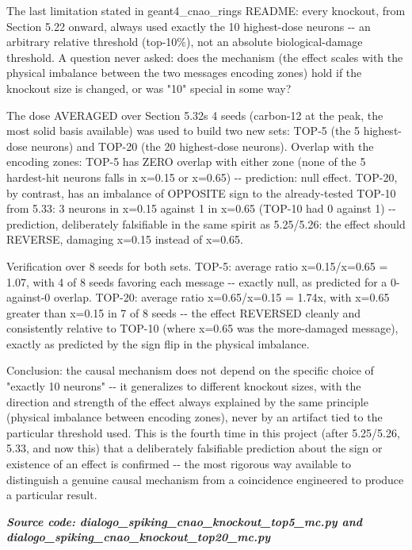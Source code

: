 \documentclass[
  english,
]{article}
\newcounter{none} %
\begin{document}
The last limitation stated in geant4\_\allowbreak{}cnao\_\allowbreak{}ring\textquotesingle s README: every knockout, from Section 5.22 onward, always used exactly the 10 highest-dose neurons -\/- an arbitrary relative threshold (top-10\%), not an absolute biological-damage threshold. A question never asked: does the mechanism (the effect scales with the physical imbalance between the two messages\textquotesingle{} encoding zones) hold if the knockout size is changed, or was "10" special in some way?

The dose AVERAGED over Section 5.32\textquotesingle s 4 seeds (carbon-12 at the peak, the most solid basis available) was used to build two new sets: TOP-5 (the 5 highest-dose neurons) and TOP-20 (the 20 highest-dose neurons). Overlap with the encoding zones: TOP-5 has ZERO overlap with either zone (none of the 5 hardest-hit neurons falls in x=0.15 or x=0.65) -\/- prediction: null effect. TOP-20, by contrast, has an imbalance of OPPOSITE sign to the already-tested TOP-10 from 5.33: 3 neurons in x=0.15 against 1 in x=0.65 (TOP-10 had 0 against 1) -\/- prediction, deliberately falsifiable in the same spirit as 5.25/5.26: the effect should REVERSE, damaging x=0.15 instead of x=0.65.

Verification over 8 seeds for both sets. TOP-5: average ratio x=0.15/x=0.65 = 1.07, with 4 of 8 seeds favoring each message -\/- exactly null, as predicted for a 0-against-0 overlap. TOP-20: average ratio x=0.65/x=0.15 = 1.74x, with x=0.65 greater than x=0.15 in 7 of 8 seeds -\/- the effect REVERSED cleanly and consistently relative to TOP-10 (where x=0.65 was the more-damaged message), exactly as predicted by the sign flip in the physical imbalance.

Conclusion: the causal mechanism does not depend on the specific choice of "exactly 10 neurons" -\/- it generalizes to different knockout sizes, with the direction and strength of the effect always explained by the same principle (physical imbalance between encoding zones), never by an artifact tied to the particular threshold used. This is the fourth time in this project (after 5.25/5.26, 5.33, and now this) that a deliberately falsifiable prediction about the sign or existence of an effect is confirmed -\/- the most rigorous way available to distinguish a genuine causal mechanism from a coincidence engineered to produce a particular result.

\textit{\textbf{Source code: dialogo\_\allowbreak{}spiking\_\allowbreak{}cnao\_\allowbreak{}knockout\_\allowbreak{}top5\_\allowbreak{}mc.py and dialogo\_\allowbreak{}spiking\_\allowbreak{}cnao\_\allowbreak{}knockout\_\allowbreak{}top20\_\allowbreak{}mc.py}}
\end{document}
